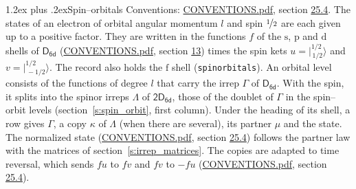 \documentclass[10pt,a4paper]{article}
\makeatletter
\renewcommand\section{\@startsection{section}{1}{\z@}{-3ex plus -1ex minus -.2ex}%
  {1.2ex plus .2ex}{\normalfont\large\sffamily\bfseries\color{parttitle}}}
\numberwithin{equation}{section}
\newcommand{\grp}[1]{\mathsf{#1}}
\newcommand{\orbital}[1]{\mathrm{#1}}
\newcommand{\mult}{\kappa}
\newcommand{\intx}{\mu}
\newcommand{\jm}[2]{\bigl\lvert{}^{#1}_{\,#2}\bigr\rangle}
\makeatother
\begin{document}
\section{Spin--orbitals}\label{s:spin_orbitals}
Conventions: \href{../../CONVENTIONS.pdf}{CONVENTIONS.pdf}, section \href{../../CONVENTIONS.pdf\#conv.25.4}{25.4}.
\leavevmode\label{n:index.orbital.l}The states of an electron of orbital angular momentum $l$ and spin $\nicefrac{1}{2}$ are each given up to a positive factor. \label{n:local.spinor.uv}\label{n:local.function.f}They are written in the functions $f$ of the $\orbital{s}$, $\orbital{p}$ and $\orbital{d}$ shells of \href{../../../rotation/data/pdf/D6d.pdf}{$\grp{D_{6d}}$} (\href{../../CONVENTIONS.pdf}{CONVENTIONS.pdf}, section \href{../../../rotation/CONVENTIONS.pdf\#conv.13}{13}) times the spin kets $u = \jm{1/2}{1/2}$ and $v = \jm{1/2}{-1/2}$. The record also holds the $\orbital{f}$ shell (\texttt{spinorbitals}). An orbital level consists of the functions of degree $l$ that carry the irrep $\Gamma$ of \href{../../../rotation/data/pdf/D6d.pdf}{$\grp{D_{6d}}$}. With the spin, it splits into the spinor irreps $\Lambda$ of $\grp{2D_{6d}}$, those of the doublet of $\Gamma$ in the spin--orbit levels (section~\ref{s:spin_orbit}, first column). \label{n:head.state}Under the heading of its shell, a row gives $\Gamma$, a copy $\mult$ of $\Lambda$ (when there are several), its partner $\intx$ and the state. The normalized state (\href{../../CONVENTIONS.pdf}{CONVENTIONS.pdf}, section \href{../../CONVENTIONS.pdf\#conv.25.4}{25.4}) follows the partner law with the matrices of section~\ref{s:irrep_matrices}. The copies are adapted to time reversal, which sends $f u$ to $f v$ and $f v$ to $-f u$ (\href{../../CONVENTIONS.pdf}{CONVENTIONS.pdf}, section \href{../../CONVENTIONS.pdf\#conv.25.4}{25.4}).
\end{document}
